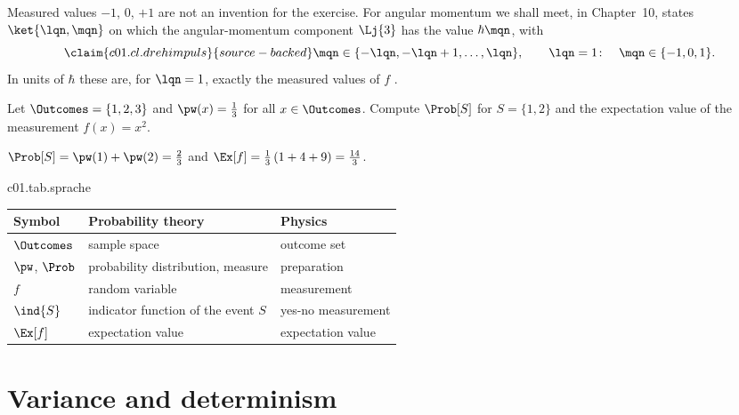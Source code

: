Measured values $-1$, $0$, $+1$ are not an invention for the exercise. For angular momentum
we shall meet, in Chapter~10, states $\ket{\lqn, \mqn}$ on which the angular-momentum
component $\Lj{3}$ has the value $\hbar \mqn$, with
\begin{equation}\label{c01.eq.drehimpuls}\claim{c01.cl.drehimpuls}{source-backed}
  \mqn \in \{-\lqn, -\lqn + 1, \dots, \lqn\},
  \qquad
  \lqn = 1\colon \quad \mqn \in \{-1, 0, 1\} .
\end{equation}
In units of $\hbar$ these are, for $\lqn = 1$, exactly the measured values of $f$
.

\begin{exercise}\label{c01.exc.drei}
  Let $\Outcomes = \{1, 2, 3\}$ and $\pw(x) = \tfrac13$ for all $x \in \Outcomes$.
  Compute $\Prob[S]$ for $S = \{1, 2\}$ and the expectation value of the measurement
  $f(x) = x^2$.
\end{exercise}
\begin{solution}
  $\Prob[S] = \pw(1) + \pw(2) = \tfrac23$ and
  $\Ex[f] = \tfrac13\,(1 + 4 + 9) = \tfrac{14}{3}$.
\end{solution}

\begin{tpctable}{c01.tab.sprache}
  \caption{The same things in two languages. On the left the words of probability theory,
    on the right those of physics, which this course uses.}
  \begin{tabular}{lll}
    \toprule
    Symbol & Probability theory & Physics \\
    \midrule
    $\Outcomes$ & sample space & outcome set \\
    $\pw$, $\Prob$ & probability distribution, measure & preparation \\
    $f$ & random variable & measurement \\
    $\ind{S}$ & indicator function of the event $S$ & yes-no measurement \\
    $\Ex[f]$ & expectation value & expectation value \\
    \bottomrule
  \end{tabular}
\end{tpctable}

\section{Variance and determinism}\label{c01.s3}

